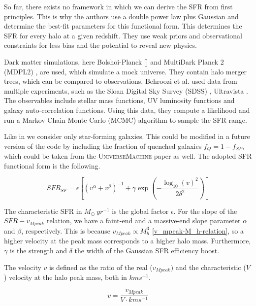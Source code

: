So far, there exists no framework in which we can derive the SFR from first principles. This is why the authors use a double power law plus Gaussian and determine the best-fit parameters for this functional form. This determines the SFR for every halo at a given redshift. They use weak priors and observational constraints for less bias and the potential to reveal new physics.

Dark matter simulations, here Bolshoi-Planck [\cite{klypin_dark_2011}] and MultiDark Planck 2 (MDPL2) \cite{klypin_multidark_2016}, are used, which simulate a mock universe. They contain halo merger trees, which can be compared to observations. Behroozi et al. used data from multiple experiments, such as the Sloan Digital Sky Survey (SDSS) \cite{abazajian_seventh_2009}, Ultravista \cite{mccracken_ultravista_2012}. The observables include stellar mass functions, UV luminosity functions and galaxy auto-correlation functions.
Using this data, they compute a likelihood and run a Markov Chain Monte Carlo (MCMC) algorithm to sample the SFR range.

Like in \cite{dallarmi_dipole_2022} we consider only star-forming galaxies. This could be modified in a future version of the code by including the fraction of quenched galaxies $f_Q = 1 -f_{SF}$, which could be taken from the \textsc{UniverseMachine} paper as well. The adopted SFR functional form is the following.

\begin{equation}
    SFR_{SF} = \epsilon \left[ \left( v^\alpha + v^\beta \right)^{-1} + \gamma \exp \left(-\frac{\log_{10}(v)^2}{2\delta^2}\right) \right]
\end{equation}

The characteristic SFR  in $M_\odot\ yr^{-1}$ is the global factor $\epsilon$. For the slope of the $SFR-v_{Mpeak}$ relation, we have a faint-end and a massive-end slope parameter $\alpha$ and $\beta$, respectively. This is because $v_{Mpeak} \propto M_h^3$ \ref{v_mpeak-M_h-relation}, so a higher velocity at the peak mass corresponds to a higher halo mass.
Furthermore, $\gamma$ is the strength and $\delta$ the width of the Gaussian SFR efficiency boost. 

The velocity $v$ is defined as the ratio of the real ($v_{Mpeak})$ and the characteristic ($V$) velocity at the halo peak mass, both in $km s^{-1}$.

\begin{equation}
    v = \frac{v_{Mpeak}}{V \cdot km s^{-1}}
\end{equation}

